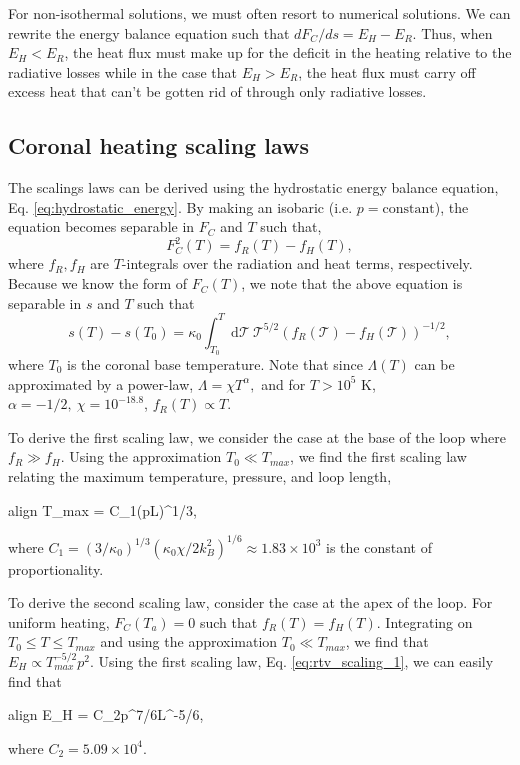 	For non-isothermal solutions, we must often resort to numerical solutions. We can rewrite the energy balance equation such that $dF_C/ds=E_H-E_R$. Thus, when $E_H<E_R$, the heat flux must make up for the deficit in the heating relative to the radiative losses while in the case that $E_H>E_R$, the heat flux must carry off excess heat that can't be gotten rid of through only radiative losses.

	\subsection{Coronal heating scaling laws}
	\citep[see][]{rosner_dynamics_1978,martens_scaling_2010}
	The scalings laws can be derived using the hydrostatic energy balance equation, Eq. \ref{eq:hydrostatic_energy}. By making an isobaric (i.e. $p=\mathrm{constant}$), the equation becomes separable in $F_C$ and $T$ such that,
	\begin{equation}
		F_C^2(T) = f_R(T) - f_H(T),
	\end{equation}
	where $f_R,f_H$ are $T$-integrals over the radiation and heat terms, respectively. Because we know the form of $F_C(T)$, we note that the above equation is separable in $s$ and $T$ such that
	\begin{equation}
		\label{eq:scaling_starting}
		s(T) - s(T_0) = \kappa_0\int_{T_0}^T\mathrm{d}\mathcal{T}~\mathcal{T}^{5/2}(f_R(\mathcal{T}) - f_H(\mathcal{T}))^{-1/2},
	\end{equation}
	where $T_0$ is the coronal base temperature. Note that since $\Lambda(T)$ can be approximated by a power-law, $\Lambda=\chi T^{\alpha},$ and for $T>10^5$ K, $\alpha=-1/2,~\chi=10^{-18.8}$, $f_R(T)\propto T$. 
	
	To derive the first scaling law, we consider the case at the base of the loop where $f_R\gg f_H$. Using the approximation $T_0\ll T_{max}$, we find the first scaling law relating the maximum temperature, pressure, and loop length,
	\begin{empheq}[box=\widefbox]{align}
		\label{eq:rtv_scaling_1}
		T_{max} = C_1(pL)^{1/3},
	\end{empheq}
	where $C_1=(3/\kappa_0)^{1/3}(\kappa_0\chi/2k_B^2)^{1/6}\approx1.83\times10^3$ is the constant of proportionality. 
	
	To derive the second scaling law, consider the case at the apex of the loop. For uniform heating, $F_C(T_{a})=0$ such that $f_R(T)=f_H(T)$.  Integrating on $T_0\le T\le T_{max}$ and using the approximation $T_0\ll T_{max}$, we find that $E_H\propto T_{max}^{-5/2}p^2$. Using the first scaling law, Eq. \ref{eq:rtv_scaling_1}, we can easily find that
	\begin{empheq}[box=\widefbox]{align}
		\label{eq:rtv_scaling_2}
		E_H = C_2p^{7/6}L^{-5/6},
	\end{empheq}
	where $C_2=5.09\times10^4$. 

